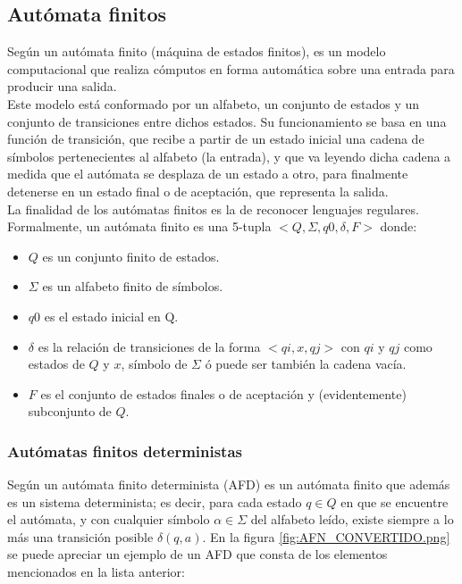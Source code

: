 \subsection {Autómata finitos}  
Según \cite{[PINOCHO]} un autómata finito (máquina de estados finitos), es un modelo computacional que realiza cómputos en forma automática sobre una entrada para producir una salida.\\
\hspace*{1cm}Este modelo está conformado por un alfabeto, un conjunto de estados y un conjunto de transiciones entre dichos estados. Su funcionamiento se basa en una función de transición, que recibe a partir de un estado inicial una cadena de símbolos pertenecientes al alfabeto (la entrada), y que va leyendo dicha cadena a medida que el autómata se desplaza de un estado a otro, para finalmente detenerse en un estado final o de aceptación, que representa la salida.\\
\hspace*{1cm}La finalidad de los autómatas finitos es la de reconocer lenguajes regulares. Formalmente, un autómata finito es una 5-tupla $<Q, \Sigma, q0, \delta, F>$ donde:
    \begin{itemize}
        \item \textbf{$Q$} es un conjunto finito de estados.
        \item \textbf{$\Sigma$} es un alfabeto finito de símbolos.
        \item \textbf{$q0$} es el estado inicial en Q.
        \item \textbf{$\delta$} es la relación de transiciones de la forma $<qi,x,qj>$ con $qi$ y $qj$ como estados de $Q$ y $x$, símbolo de $\Sigma$ ó puede ser también la cadena vacía.
        \item \textbf{$F$} es el conjunto de estados finales o de aceptación y (evidentemente) subconjunto de $Q$.
    \end{itemize}
    

\subsubsection {Autómatas finitos deterministas}  
Según \cite{[PINOCHO2]} un autómata finito determinista (AFD) es un autómata finito que además es un sistema determinista; es decir, para cada estado $q \in Q$ en que se encuentre el autómata, y con cualquier símbolo $\alpha \in \Sigma$ del alfabeto leído, existe siempre a lo más una transición posible $\delta(q,a)$. En la figura \ref{fig:AFN_CONVERTIDO.png} se puede apreciar un ejemplo de un AFD que consta de los elementos mencionados en la lista anterior:

